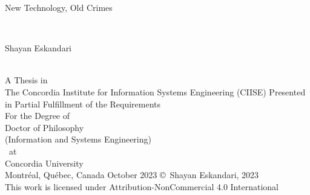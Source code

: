 
\thispagestyle{empty} %

\begin{center} 
\begin{Large} New Technology, Old Crimes \end{Large}\\[3em]
\begin{large} Shayan Eskandari \end{large}\\
\vfill
A Thesis in\\
The Concordia Institute for Information Systems Engineering (CIISE)
\vfill
Presented in Partial Fulfillment of the Requirements\\
For the Degree of\\
Doctor of Philosophy\\ 
(Information and Systems Engineering)\\~at\\
Concordia University\\
Montr\'{e}al, Qu\'{e}bec, Canada
\vfill
October 2023 %
\vfill
\copyright~Shayan Eskandari, 2023\\
This work is licensed under Attribution-NonCommercial 4.0 International
\end{center}

